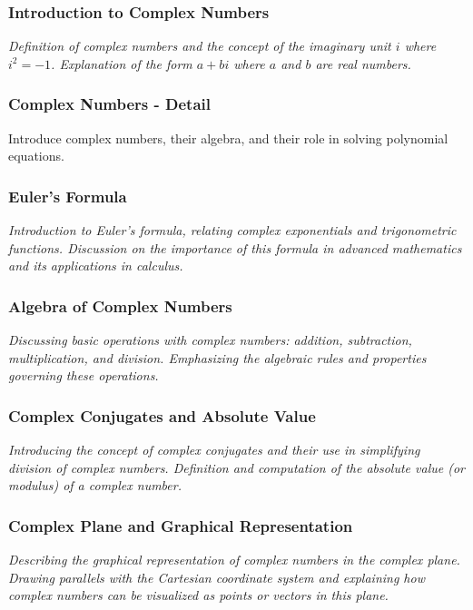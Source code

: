 \documentclass[a4paper,12pt]{book}
\begin{document}
\subsubsection{Introduction to Complex Numbers}
\textit{Definition of complex numbers and the concept of the imaginary unit \( i \) where \( i^2 = -1 \). Explanation of the form \( a + bi \) where \( a \) and \( b \) are real numbers.}


\subsubsection{Complex Numbers - Detail}
\label{subsec:complex_numbers_detail}
Introduce complex numbers, their algebra, and their role in solving polynomial equations.


\subsubsection{Euler's Formula}
\textit{Introduction to Euler's formula, relating complex exponentials and trigonometric functions. Discussion on the importance of this formula in advanced mathematics and its applications in calculus.}


\subsubsection{Algebra of Complex Numbers}
\textit{Discussing basic operations with complex numbers: addition, subtraction, multiplication, and division. Emphasizing the algebraic rules and properties governing these operations.}


\subsubsection{Complex Conjugates and Absolute Value}
\textit{Introducing the concept of complex conjugates and their use in simplifying division of complex numbers. Definition and computation of the absolute value (or modulus) of a complex number.}


\subsubsection{Complex Plane and Graphical Representation}
\textit{Describing the graphical representation of complex numbers in the complex plane. Drawing parallels with the Cartesian coordinate system and explaining how complex numbers can be visualized as points or vectors in this plane.}
\end{document}
